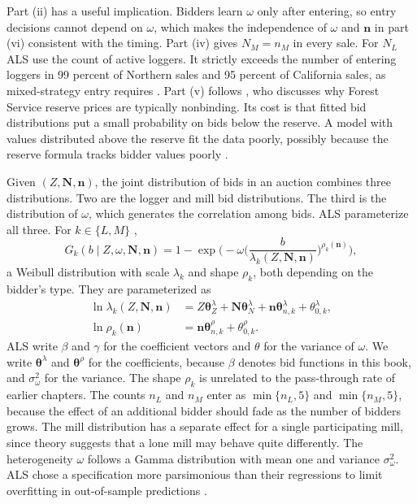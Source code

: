 Part (ii) has a useful implication. Bidders learn $\omega$ only after entering, so entry decisions cannot
depend on $\omega$, which makes the independence of $\omega$ and $\bm n$ in part (vi) consistent with the
timing. Part (iv) gives $N_M=n_M$ in every sale. For $N_L$ ALS use the count of active loggers. It
strictly exceeds the number of entering loggers in 99 percent of Northern sales and 95 percent of
California sales, as mixed-strategy entry requires \citep[p.~245]{AtheyLevinSeira2011}.
Part (v) follows
\citet{Haile2001}, who discusses why Forest Service reserve prices are typically nonbinding. Its cost is
that fitted bid distributions put a small probability on bids below the reserve. A model with values
distributed above the reserve fit the data poorly, possibly because the reserve formula tracks bidder
values poorly \citep[footnote 20]{AtheyLevinSeira2011}.

Given $(Z,\bm N,\bm n)$, the joint distribution of bids in an auction combines three distributions. Two
are the logger and mill bid distributions. The third is the distribution of $\omega$, which generates the
correlation among bids. ALS parameterize all three. For $k\in\{L,M\}$ \citep[eq.~(8)]{AtheyLevinSeira2011},
\begin{equation}\label{eq:15-als-weibull}
G_k(b\mid Z,\omega,\bm N,\bm n)=1-\exp\Biggl(-\omega\biggl(\frac{b}{\lambda_k(Z,\bm N,\bm n)}\biggr)^{\rho_k(\bm n)}\Biggr),
\end{equation}
a Weibull distribution with scale $\lambda_k$ and shape $\rho_k$, both depending on the bidder's type.
They are parameterized as
\begin{align}
\ln\lambda_k(Z,\bm N,\bm n)&=Z\bm\theta^\lambda_Z+\bm N\bm\theta^\lambda_N+\bm n\bm\theta^\lambda_{n,k}+\theta^\lambda_{0,k},\label{eq:15-als-lambda}\\
\ln\rho_k(\bm n)&=\bm n\bm\theta^\rho_{n,k}+\theta^\rho_{0,k}.\label{eq:15-als-rho}
\end{align}
ALS write $\beta$ and $\gamma$ for the coefficient vectors and $\theta$ for the variance of $\omega$. We
write $\bm\theta^\lambda$ and $\bm\theta^\rho$ for the coefficients, because $\beta$ denotes bid functions in
this book, and $\sigma^2_\omega$ for the variance. The shape $\rho_k$ is unrelated to the
pass-through rate of earlier chapters. The counts $n_L$ and $n_M$ enter as $\min\{n_L,5\}$ and
$\min\{n_M,5\}$, because the effect of an additional bidder should fade as the number of bidders grows.
The mill distribution has a separate effect for a single participating mill, since theory suggests that
a lone mill may behave quite differently. The heterogeneity $\omega$ follows a Gamma distribution with
mean one and variance $\sigma^2_\omega$. ALS chose a specification more parsimonious than their
regressions to limit overfitting in out-of-sample predictions \citep[footnote 21]{AtheyLevinSeira2011}.

